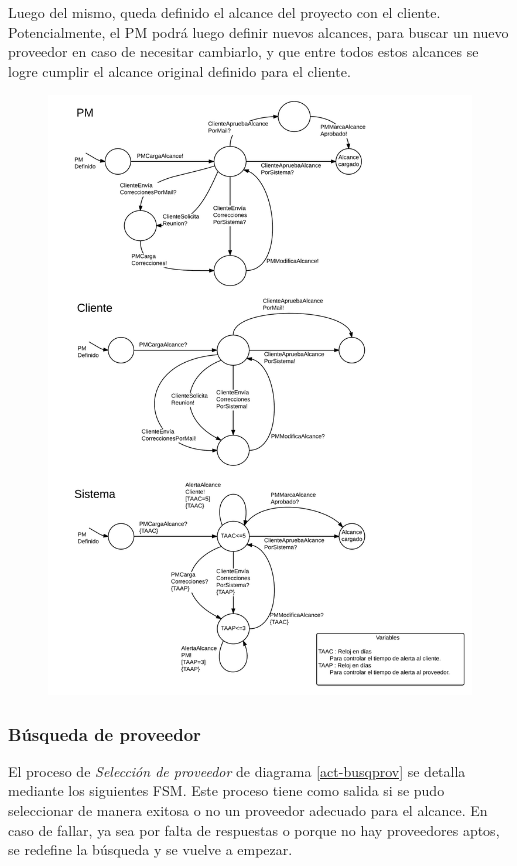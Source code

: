 Luego del mismo, queda definido el alcance del proyecto con el cliente. 
Potencialmente, el PM podrá luego definir nuevos alcances, para buscar un nuevo 
proveedor en caso de necesitar cambiarlo, y que entre todos estos alcances 
se logre cumplir el alcance original definido para el cliente. 

\begin{figure}[H]
\centering
\includegraphics[width=0.8\linewidth]{diag/nuevos/fsm-alcance.png}
\label{fsm-alcance}
\end{figure}


		\subsubsection{Búsqueda de proveedor}
El proceso de \textit{Selección de proveedor} de diagrama \ref{act-busqprov} se detalla mediante 
los siguientes FSM. Este proceso tiene como salida si se pudo seleccionar de 
manera exitosa o no un proveedor adecuado para el alcance. En caso de fallar, ya sea 
por falta de respuestas o porque no hay proveedores aptos, se redefine la búsqueda y 
se vuelve a empezar. 

